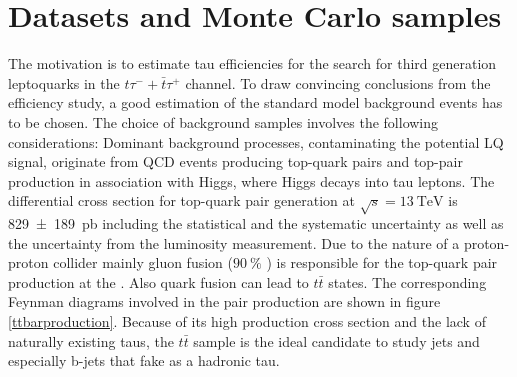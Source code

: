 \section{Datasets and Monte Carlo samples}\label{MCsamples}
The motivation is to estimate tau efficiencies for the search for third generation leptoquarks in the $t\tau^{-}+\bar{t}\tau^{+}$ channel. To draw convincing conclusions from the efficiency study, a good estimation of the standard model background events has to be chosen. The choice of background samples involves the following considerations:\newline
Dominant background processes, contaminating the potential LQ signal, originate from QCD events producing top-quark pairs and top-pair production in association with Higgs, where Higgs decays into tau leptons.\newline
The differential cross section for top-quark pair generation at $\sqrt{s}=\SI{13}{\tera\electronvolt}$ is \SI{829\pm189}{\pico\barn} \cite{ttbarpairproduction} including the statistical and the systematic uncertainty as well as the uncertainty from the luminosity measurement. Due to the nature of a proton-proton collider mainly gluon fusion ($\SI{90}{\percent}$ \cite{PhysRevD}) is responsible for the top-quark pair production at the {\LHC}. Also quark fusion can lead to $t\bar{t}$ states. The corresponding Feynman diagrams involved in the pair production are shown in figure \ref{ttbarproduction}. Because of its high production cross section and the lack of naturally existing taus, the $t\bar{t}$ sample is the ideal candidate to study jets and especially b-jets that fake as a hadronic tau.  
%
